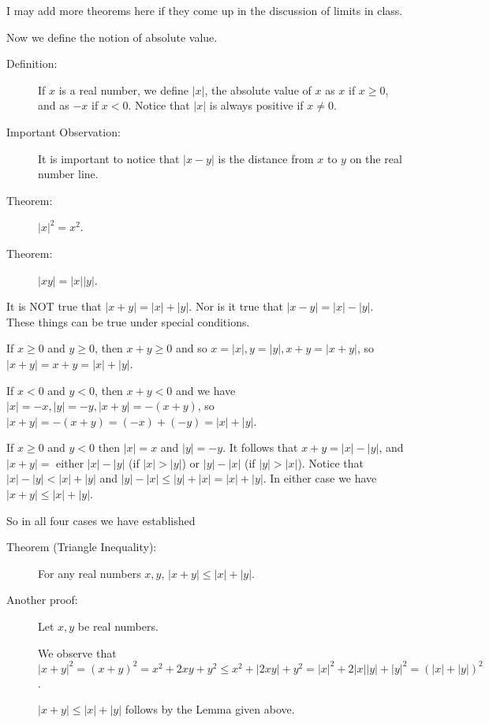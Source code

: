 \documentclass[12pt]{article}
\begin{document}
I may add more theorems here if they come up in the discussion of limits in class.

Now we define the notion of absolute value.

\begin{description}

\item[Definition:]  If $x$ is a real number, we define $|x|$, the absolute value of $x$ as $x$ if $x \geq 0$, and as $-x$ if $x<0$.  Notice that $|x|$ is always positive if $x \neq 0$.

\item[Important Observation:]  It is important to notice that $|x-y|$ is the distance from $x$ to $y$ on the real number line.

\item[Theorem:]  $|x|^2 = x^2$.

\item[Theorem:]  $|xy| = |x||y|$.

\end{description}

It is NOT true that $|x+y| = |x|+|y|$.  Nor is it true that $|x-y| = |x|-|y|$.  These things can be true under special conditions.

If $x\geq 0$ and $y\geq 0$, then $x+y\geq 0$ and so $x=|x|, y=|y|,x+y=|x+y|$, so $|x+y| = x+y = |x|+|y|$.

If $x<0$ and $y<0$, then $x+y<0$ and we have $|x|=-x, |y|=-y, |x+y| = -(x+y)$, so $|x+y| = -(x+y) = (-x)+(-y) = |x|+|y|$.

If $x\geq 0$ and $y<0$ then $|x|=x$ and $|y| = -y$.  It follows that $x+y = |x|-|y|$, and $|x+y|= $ either
$|x|-|y|$ (if $|x|>|y|$) or $|y|-|x|$ (if $|y|>|x|$).  Notice that $|x|-|y|<|x|+|y|$ and $|y|-|x|\leq |y|+|x| = |x|+|y|$.
In either case we have $|x+y| \leq |x|+|y|$.

So in all four cases we have established

\begin{description}

\item[Theorem (Triangle Inequality):]  For any real numbers $x,y$, $|x+y| \leq |x|+|y|$.

\item[Another proof:]  Let $x,y$ be real numbers.

We observe that $|x+y|^2 = (x+y)^2 = x^2+2xy+y^2 \leq x^2+|2xy|+y^2 = |x|^2+2|x||y|+|y|^2 = (|x|+|y|)^2$.

$|x+y| \leq |x|+|y|$ follows by the Lemma given above.


\end{description}
\end{document}
